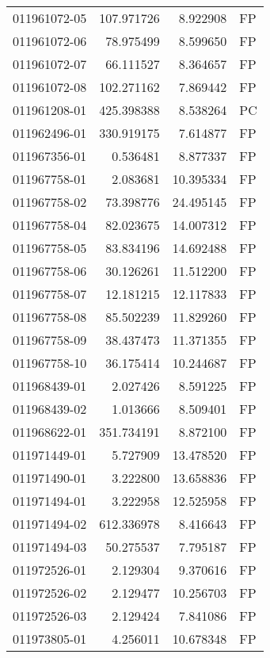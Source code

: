 \begin{tabular}{lrrl}
011961072-05 &  107.971726 &       8.922908 &   FP \\
011961072-06 &   78.975499 &       8.599650 &   FP \\
011961072-07 &   66.111527 &       8.364657 &   FP \\
011961072-08 &  102.271162 &       7.869442 &   FP \\
011961208-01 &  425.398388 &       8.538264 &   PC \\
011962496-01 &  330.919175 &       7.614877 &   FP \\
011967356-01 &    0.536481 &       8.877337 &   FP \\
011967758-01 &    2.083681 &      10.395334 &   FP \\
011967758-02 &   73.398776 &      24.495145 &   FP \\
011967758-04 &   82.023675 &      14.007312 &   FP \\
011967758-05 &   83.834196 &      14.692488 &   FP \\
011967758-06 &   30.126261 &      11.512200 &   FP \\
011967758-07 &   12.181215 &      12.117833 &   FP \\
011967758-08 &   85.502239 &      11.829260 &   FP \\
011967758-09 &   38.437473 &      11.371355 &   FP \\
011967758-10 &   36.175414 &      10.244687 &   FP \\
011968439-01 &    2.027426 &       8.591225 &   FP \\
011968439-02 &    1.013666 &       8.509401 &   FP \\
011968622-01 &  351.734191 &       8.872100 &   FP \\
011971449-01 &    5.727909 &      13.478520 &   FP \\
011971490-01 &    3.222800 &      13.658836 &   FP \\
011971494-01 &    3.222958 &      12.525958 &   FP \\
011971494-02 &  612.336978 &       8.416643 &   FP \\
011971494-03 &   50.275537 &       7.795187 &   FP \\
011972526-01 &    2.129304 &       9.370616 &   FP \\
011972526-02 &    2.129477 &      10.256703 &   FP \\
011972526-03 &    2.129424 &       7.841086 &   FP \\
011973805-01 &    4.256011 &      10.678348 &   FP \\

\end{tabular}
